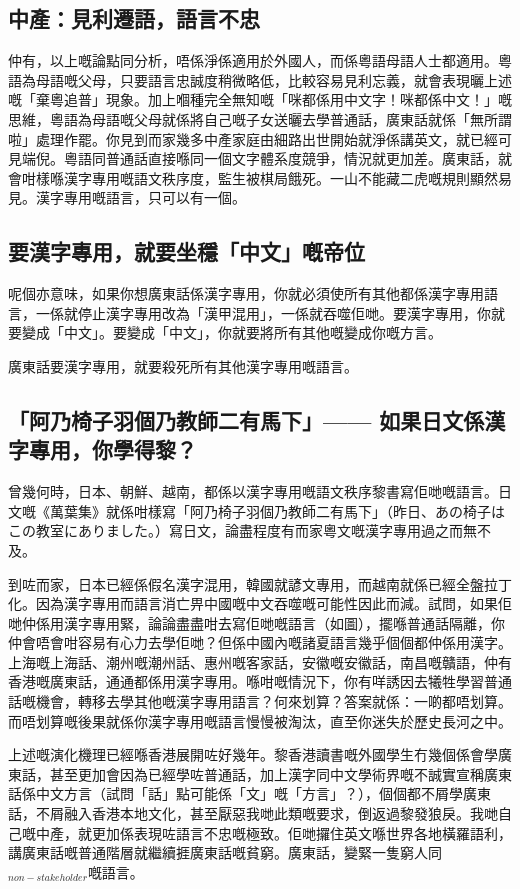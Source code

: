 \documentclass[a5paper, 10pt, openany]{book} %
\begin{document}
\subsection*{中產：見利遷語，語言不忠}
仲有，以上嘅論點同分析，唔係淨係適用於外國人，而係粵語母語人士都適用。粵語為母語嘅父母，只要語言忠誠度稍微略低，比較容易見利忘義，就會表現曬上述嘅「棄粵追普」現象。加上嗰種完全無知嘅「咪都係用中文字！咪都係中文！」嘅思維，粵語為母語嘅父母就係將自己嘅子女送曬去學普通話，廣東話就係「無所謂啦」處理作罷。你見到而家幾多中產家庭由細路出世開始就淨係講英文，就已經可見端倪。粵語同普通話直接喺同一個文字體系度競爭，情況就更加差。廣東話，就會咁樣喺漢字專用嘅語文秩序度，監生被棋局餓死。一山不能藏二虎嘅規則顯然易見。漢字專用嘅語言，只可以有一個。

\subsection*{要漢字專用，就要坐穩「中文」嘅帝位}
呢個亦意味，如果你想廣東話係漢字專用，你就必須使所有其他都係漢字專用語言，一係就停止漢字專用改為「漢甲混用」，一係就吞噬佢哋。要漢字專用，你就要變成「中文」。要變成「中文」，你就要將所有其他嘅變成你嘅方言。

廣東話要漢字專用，就要殺死所有其他漢字專用嘅語言。

\subsection*{「阿乃椅子羽個乃教師二有馬下」—— 如果日文係漢字專用，你學得黎？}
曾幾何時，日本、朝鮮、越南，都係以漢字專用嘅語文秩序黎書寫佢哋嘅語言。日文嘅《萬葉集》就係咁樣寫「阿乃椅子羽個乃教師二有馬下」（昨日、あの椅子はこの教室にありました。）寫日文，論盡程度有而家粵文嘅漢字專用過之而無不及。

到咗而家，日本已經係假名漢字混用，韓國就諺文專用，而越南就係已經全盤拉丁化。因為漢字專用而語言消亡畀中國嘅中文吞噬嘅可能性因此而減。試問，如果佢哋仲係用漢字專用緊，論論盡盡咁去寫佢哋嘅語言（如圖），擺喺普通話隔離，你仲會唔會咁容易有心力去學佢哋？但係中國內嘅諸夏語言幾乎個個都仲係用漢字。上海嘅上海話、潮州嘅潮州話、惠州嘅客家話，安徽嘅安徽話，南昌嘅贛語，仲有香港嘅廣東話，通通都係用漢字專用。喺咁嘅情況下，你有咩誘因去犧牲學習普通話嘅機會，轉移去學其他嘅漢字專用語言？何來划算？答案就係：一啲都唔划算。而唔划算嘅後果就係你漢字專用嘅語言慢慢被淘汰，直至你迷失於歷史長河之中。

上述嘅演化機理已經喺香港展開咗好幾年。黎香港讀書嘅外國學生冇幾個係會學廣東話，甚至更加會因為已經學咗普通話，加上漢字同中文學術界嘅不誠實宣稱廣東話係中文方言（試問「話」點可能係「文」嘅「方言」？），個個都不屑學廣東話，不屑融入香港本地文化，甚至厭惡我哋此類嘅要求，倒返過黎發狼戾。我哋自己嘅中產，就更加係表現咗語言不忠嘅極致。佢哋攞住英文喺世界各地橫羅語利，講廣東話嘅普通階層就繼續捱廣東話嘅貧窮。廣東話，變緊一隻窮人同$_{non-stakeholder}$嘅語言。
\end{document}
